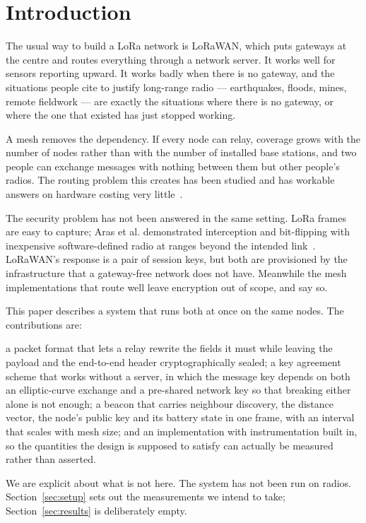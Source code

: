 \documentclass[conference]{IEEEtran}
\begin{document}
\section{Introduction}

The usual way to build a LoRa network is LoRaWAN, which puts gateways at the
centre and routes everything through a network server. It works well for sensors
reporting upward. It works badly when there is no gateway, and the situations
people cite to justify long-range radio — earthquakes, floods, mines, remote
fieldwork — are exactly the situations where there is no gateway, or where the
one that existed has just stopped working.

A mesh removes the dependency. If every node can relay, coverage grows with the
number of nodes rather than with the number of installed base stations, and two
people can exchange messages with nothing between them but other people's
radios. The routing problem this creates has been studied and has workable
answers on hardware costing very little~\cite{sole2022loramesher,
centelles2024dsdv, arregui2025gatewayfree}.

The security problem has not been answered in the same setting. LoRa frames are
easy to capture; Aras et al. demonstrated interception and bit-flipping with
inexpensive software-defined radio at ranges beyond the intended
link~\cite{aras2017exploring}. LoRaWAN's response is a pair of session keys, but
both are provisioned by the infrastructure that a gateway-free network does not
have. Meanwhile the mesh implementations that route well leave encryption out of
scope, and say so.

This paper describes a system that runs both at once on the same nodes. The
contributions are:

a packet format that lets a relay rewrite the fields it must while leaving the
payload and the end-to-end header cryptographically sealed; a key agreement
scheme that works without a server, in which the message key depends on both an
elliptic-curve exchange and a pre-shared network key so that breaking either
alone is not enough; a beacon that carries neighbour discovery, the distance
vector, the node's public key and its battery state in one frame, with an
interval that scales with mesh size; and an implementation with instrumentation
built in, so the quantities the design is supposed to satisfy can actually be
measured rather than asserted.

We are explicit about what is not here. The system has not been run on radios.
Section~\ref{sec:setup} sets out the measurements we intend to take;
Section~\ref{sec:results} is deliberately empty.
\end{document}

